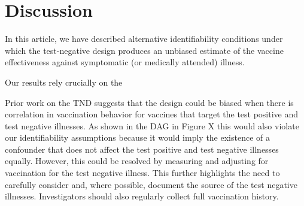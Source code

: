 \documentclass[11pt]{article}
\begin{document}
\section{Discussion} \label{sec:discussion}

In this article, we have described alternative identifiability conditions under which the test-negative design produces an unbiased estimate of the vaccine effectiveness against symptomatic (or medically attended) illness. 

Our results rely crucially on the

Prior work on the TND suggests that the design could be biased when there is correlation in vaccination behavior for vaccines that target the test positive and test negative illnesses. As shown in the DAG in Figure X this would also violate our identifiability assumptions because it would imply the existence of a confounder that does not affect the test positive and test negative illnesses equally. However, this could be resolved by measuring and adjusting for vaccination for the test negative illness. This further highlights the need to carefully consider and, where possible, document the source of the test negative illnesses. Investigators should also regularly collect full vaccination history.
\end{document}
